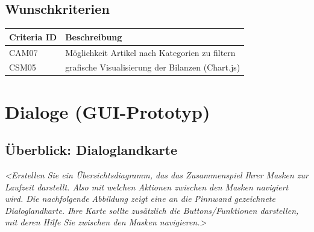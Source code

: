 \documentclass[a4paper]{article}
\begin{document}

\subsection{Wunschkriterien}

\begin{longtable}{|p{100px}|p{250px}|}
	\hline
	\rowcolor[HTML]{C0C0C0}
	Criteria ID & Beschreibung \\ \hline
	CAM07 & Möglichkeit Artikel nach Kategorien zu filtern  \\ \hline
	CSM05 & grafische Visualisierung der Bilanzen (Chart.js)  \\ \hline
\end{longtable}

\section{Dialoge (GUI-Prototyp)}

\subsection{Überblick: Dialoglandkarte}

\textit{<Erstellen Sie ein Übersichtsdiagramm, das das Zusammenspiel Ihrer Masken zur Laufzeit darstellt. Also mit welchen Aktionen zwischen den Masken navigiert wird. Die nachfolgende Abbildung zeigt eine an die Pinnwand gezeichnete Dialoglandkarte. Ihre Karte sollte zusätzlich die Buttons/Funktionen darstellen, mit deren Hilfe Sie zwischen den Masken navigieren.>}
\end{document}

